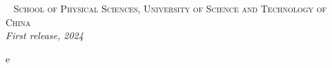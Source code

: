 \documentclass[12pt,a4paper]{ctexbook}
\title{\huge \heiti{高显经典力学习题解答}}
\author{ \ttfamily \texttt  数据风暴中的避风港\\
\ttfamily \texttt \small 二〇二四年\\}
\date{\small \today}
\begin{document}
\maketitle

\pagestyle{fancy}
\fancyhf{}
\fancyhead{}
~\vfill
\noindent \textsc{School of Physical Sciences, University of Science and Technology of China}\\

\noindent \textit{First release, 2024} %

    \pagestyle{fancy}
    \fancyhf{}
    \setcounter{page}{1}
    \tableofcontents

    \newpage
\pagestyle{fancy}e
\chead{}
\rhead{}
\lfoot{}
\cfoot{\thepage}
\rfoot{}
\setcounter{page}{1}
\end{document}
